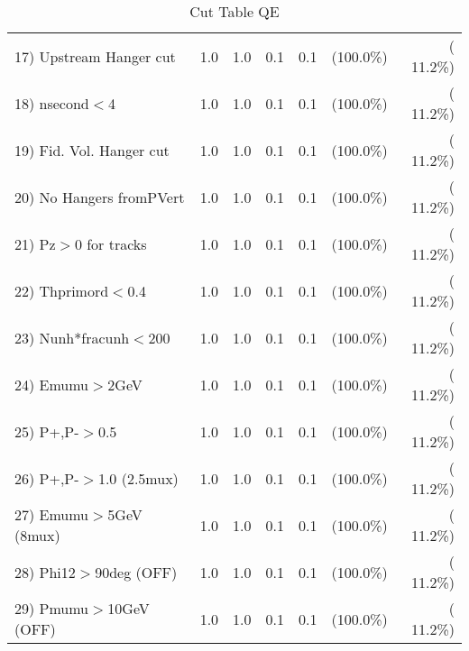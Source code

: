 \begin{table}[h!]
\begin{tabular}{||l||r|r|r|r|r|r||}
 17) Upstream Hanger cut  &          1.0 &          1.0 &          0.1 &          0.1 & (100.0\%) & ( 11.2\%) \\
 18) nsecond$<$4          &          1.0 &          1.0 &          0.1 &          0.1 & (100.0\%) & ( 11.2\%) \\
 19) Fid. Vol. Hanger cut &          1.0 &          1.0 &          0.1 &          0.1 & (100.0\%) & ( 11.2\%) \\
 20) No Hangers fromPVert &          1.0 &          1.0 &          0.1 &          0.1 & (100.0\%) & ( 11.2\%) \\
 21) Pz$>$0 for tracks    &          1.0 &          1.0 &          0.1 &          0.1 & (100.0\%) & ( 11.2\%) \\
 22) Thprimord$<$0.4      &          1.0 &          1.0 &          0.1 &          0.1 & (100.0\%) & ( 11.2\%) \\
 23) Nunh*fracunh$<$200   &          1.0 &          1.0 &          0.1 &          0.1 & (100.0\%) & ( 11.2\%) \\
 24) Emumu$>$2GeV         &          1.0 &          1.0 &          0.1 &          0.1 & (100.0\%) & ( 11.2\%) \\
 25) P+,P-$>$0.5          &          1.0 &          1.0 &          0.1 &          0.1 & (100.0\%) & ( 11.2\%) \\
 26) P+,P-$>$1.0 (2.5mux) &          1.0 &          1.0 &          0.1 &          0.1 & (100.0\%) & ( 11.2\%) \\
 27) Emumu$>$5GeV  (8mux) &          1.0 &          1.0 &          0.1 &          0.1 & (100.0\%) & ( 11.2\%) \\
 28) Phi12$>$90deg  (OFF) &          1.0 &          1.0 &          0.1 &          0.1 & (100.0\%) & ( 11.2\%) \\
 29) Pmumu$>$10GeV  (OFF) &          1.0 &          1.0 &          0.1 &          0.1 & (100.0\%) & ( 11.2\%) \\
 \hline
 \hline
 \end{tabular}
 \caption{Cut Table  QE       }
 \label{tab-cutcohjpsi-mumu_qe}
 \end{table}
